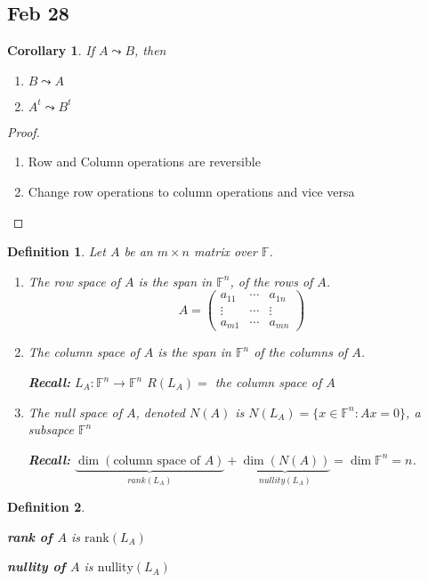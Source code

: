 \documentclass[12pt]{article}
\newtheorem{definition}{Definition}[subsection]
\newtheorem{corollary}{Corollary}[subsection]
\newcommand{\rank}{\mathrm{rank}}
\newcommand{\nullity}{\mathrm{nullity}}
\newcommand{\mF}{{\mathbb{F}}}
\begin{document}
\subsection{Feb 28}
\begin{corollary}
	If $A \leadsto B$, then
	\begin{enumerate}
		\item $B \leadsto A$ 
		\item $A^t \leadsto B^t$
	\end{enumerate}
\end{corollary}
\begin{proof}
	\begin{enumerate}
		\item Row and Column operations are reversible
		\item Change row operations to column operations and vice versa
	\end{enumerate}
\end{proof}

\begin{definition}
	Let $A$ be an $m \times n$ matrix over $\mF$. 
	\begin{enumerate}
		\item The row space of $A$ is the span in $\mF^n$, of the rows of $A$. 
		\[
			A = 
			\begin{pmatrix}
				a_{11} & \cdots & a_{1n}	\\
				\vdots & \cdots & \vdots	\\
				a_{m1} & \cdots & a_{mn}	
			\end{pmatrix}
		\]
		\item The column space of $A$ is the span in $\mF^n$ of the columns of
			$A$. 

			\textbf{Recall:} $L_A : \mF^n \to \mF^n$ $R(L_A) =$ the column 
			space of $A$ 

		\item The null space of $A$, denoted $N(A)$ is 
			$N(L_A) = \{x \in \mF^n: Ax = 0\}$, a subsapce $\mF^n$

			\textbf{Recall:} 
			$\underbrace{\dim(\text{column space of } A)}_{rank(L_A)}
			+ \underbrace{\dim(N(A))}_{nullity(L_A)} = \dim \mF^n = n$.  
	\end{enumerate}
\end{definition}

\begin{definition}
	\begin{description}
		\item \textbf{rank of $A$} is $\rank(L_A)$
		\item \textbf{nullity of $A$} is $\nullity(L_A)$
	\end{description}
\end{definition}
\end{document}
